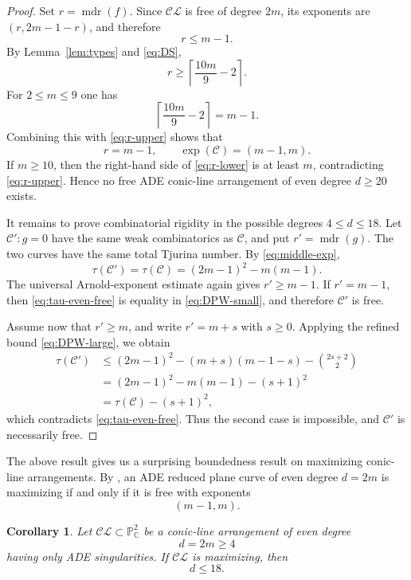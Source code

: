 \documentclass[11pt]{article}
\newtheorem{corollary}[theorem]{Corollary}
\theoremstyle{remark}
\newcommand{\mdr}{\operatorname{mdr}}
\begin{document}
\begin{proof}
Set $r=\mdr(f)$.  Since $\mathcal{CL}$ is free of degree $2m$, its exponents
are $(r,2m-1-r)$, and therefore
\begin{equation}\label{eq:r-upper}
 r\le m-1.
\end{equation}
By Lemma~\ref{lem:types} and \eqref{eq:DS},
\begin{equation}\label{eq:r-lower}
 r\ge \left\lceil\frac{10m}{9}-2\right\rceil.
\end{equation}
For $2\le m\le9$ one has
\[
 \left\lceil\frac{10m}{9}-2\right\rceil=m-1.
\]
Combining this with \eqref{eq:r-upper} shows that
\begin{equation}\label{eq:middle-exp}
 r=m-1,
 \qquad
 \exp(\mathcal C)=(m-1,m).
\end{equation}
If $m\ge10$, then the right-hand side of \eqref{eq:r-lower} is at least
$m$, contradicting \eqref{eq:r-upper}.  Hence no free ADE conic-line
arrangement of even degree $d\ge20$ exists.

It remains to prove combinatorial rigidity in the possible degrees
$4\le d\le18$.  Let $\mathcal C':g=0$ have the same weak combinatorics as
$\mathcal C$, and put $r'=\mdr(g)$.  The two curves have the same total
Tjurina number.  By \eqref{eq:middle-exp},
\begin{equation}\label{eq:tau-even-free}
 \tau(\mathcal C')=\tau(\mathcal C)
 =(2m-1)^2-m(m-1).
\end{equation}
The universal Arnold-exponent estimate again gives $r'\ge m-1$. If $r'=m-1$, then \eqref{eq:tau-even-free} is equality in
\eqref{eq:DPW-small}, and therefore $\mathcal C'$ is free.

Assume now that $r'\ge m$, and write $r'=m+s$ with $s\ge0$.  Applying the
refined bound \eqref{eq:DPW-large}, we obtain
\begin{align*}
 \tau(\mathcal C')
 &\le (2m-1)^2-(m+s)(m-1-s)-\binom{2s+2}{2}\\
 &= (2m-1)^2-m(m-1)-(s+1)^2\\
 &=\tau(\mathcal C)-(s+1)^2,
\end{align*}
which contradicts \eqref{eq:tau-even-free}.  Thus the second case is
impossible, and $\mathcal C'$ is necessarily free.
\end{proof}
The above result gives us a surprising boundedness result on maximizing conic-line arrangements. By \cite[Theorem 2.9]{max}, an ADE reduced plane curve of even degree $d=2m$ is maximizing if and only if it is free with exponents
\[
(m-1,m).
\]
\begin{corollary}
Let $\mathcal{CL}\subset \mathbb{P}^2_{\mathbb{C}}$ be a conic-line arrangement of even degree
\[
d=2m\geq 4
\]
having only ADE singularities. If $\mathcal{CL}$ is maximizing, then
\[
d\leq 18.
\]
\end{corollary}
\end{document}
